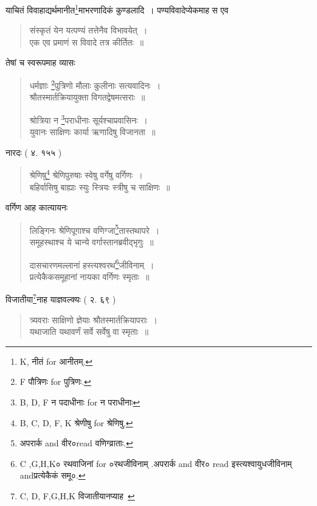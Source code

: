 \documentclass[11pt, openany]{book}
\begin{document}
याचितं विवाहाद्यर्थमानीत\renewcommand{\thefootnote}{4}\footnote{K, नीतं for आनीतम्.}माभरणादिकं कुण्डलादि~। पण्यविवादेप्येकमाह स एव

\begin{quote}
{\vy संस्कृतं येन यत्पण्यं तत्तेनैव विभावयेत्~।\\
एक एव प्रमाणं स विवादे तत्र कीर्तितः~॥}
\end{quote}

तेषां च स्वरूपमाह व्यासः

\begin{quote}
{\vy धर्मज्ञाः \renewcommand{\thefootnote}{5}\footnote{F पौत्रिणः for पुत्रिणः.}पुत्रिणो मौलाः कुलीनाः सत्यवादिनः~।\\
श्रौतस्मार्तक्रियायुक्ता विगतद्वेषमत्सराः~॥

श्रोत्रिया न \renewcommand{\thefootnote}{6}\footnote{B, D, F न पदाधीनाः for न पराधीनाः}पराधीनाः सूर्यश्चाप्रवासिनः~।\\
युवानः साक्षिणः कार्या ऋणादिषु विजानता~॥}
\end{quote}

\newpage
{}

नारदः ( ४. १५५ ) 

\begin{quote}
{\vy श्रेणिषु\renewcommand{\thefootnote}{1}\footnote{B, C, D, F, K श्रेणीषु for श्रेणिषु.} श्रेणिपुरुषाः स्वेषु वर्गेषु वर्गिणः~।\\
बहिर्वासिषु बाह्याः स्युः स्त्रियः स्त्रीषु च साक्षिणः~॥}
\end{quote}

वर्गिण आह कात्यायनः

\begin{quote}
{\vy लिङ्गिनः श्रेणिपूगाश्च वणिग्जा\renewcommand{\thefootnote}{2}\footnote{अपरार्क and वीर०read वणिग्व्राताः.}तास्तथापरे~।\\
समूहस्थाश्च ये चान्ये वर्गास्तानब्रवीद्भृगुः~॥

दासचारणमल्लानां हस्त्यश्वरथ\renewcommand{\thefootnote}{3}\footnote{C ,G,H,K० रथवाजिनां for ०रथजीविनाम् .अपरार्क and वीर० read इस्त्यश्वायुधजीविनाम् andप्रत्येकैकं समू०.}जीविनाम्~।\\
प्रत्येकैकसमूहानां नायका वर्गिणः स्मृताः~॥}
\end{quote}

विजातीया\renewcommand{\thefootnote}{4}\footnote{C, D, F,G,H,K विजातीयानप्याह\textendash\ }नाह याज्ञवल्क्यः ( २. ६९ ) 

\begin{quote}
{\vy त्र्यवराः साक्षिणो ज्ञेयाः श्रौतस्मार्तक्रियापराः~।\\
यथाजाति यथावर्णं सर्वे सर्वेषु वा स्मृताः~॥}
\end{quote}
\end{document}
